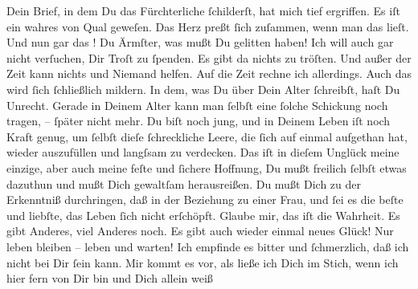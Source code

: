 \begin{ledgroupsized}[t]{13cm}
           \pstart
           Dein Brief, in dem Du das Fürchterliche ſchilderſt, hat mich tief ergriffen. Es iſt
               ein wahres \label{K_L02871-3v}\label{K_L02871-3h} von
               Qual geweſen. Das Herz preßt ſich zuſammen, wenn man das lieſt. Und nun gar das
                  \label{K_L02871-4v}\label{K_L02871-4h}! Du
               Ärmſter, was mußt Du gelitten haben! Ich will auch gar nicht verſuchen, Dir Troſt zu
               ſpenden. Es gibt  da nichts zu tröſten. Und außer der Zeit kann nichts und Niemand helfen. Auf
               die Zeit rechne ich allerdings. Auch das wird ſich ſchließlich mildern.  In dem, was Du über {\pb}Dein Alter ſchreibſt,
               haſt Du Unrecht. Gerade in Deinem Alter kann man ſelbſt eine ſolche Schickung noch
               tragen, – ſpäter nicht mehr. Du biſt noch jung, und in Deinem Leben iſt noch Kraft
               genug, um ſelbſt dieſe ſchreckliche Leere, die ſich auf einmal aufgethan hat, wieder
               auszufüllen und \strikeout{\textcolor{gray}{zu}\textcolor{gray}{×}} langſsam \introOben{}zu\introOben{} verdecken. Das iſt \strikeout{\textcolor{gray}{×}} in dieſem Unglück meine einzige, aber auch meine feſte und ſichere Hoffnung,
               Du mußt freilich ſelbſt etwas dazuthun und mußt Dich gewaltſam herausreißen. Du mußt
               Dich zu der Erkenntniß durchringen, daß in der Beziehung zu einer Frau, und ſei es
               die beſte und liebſte, das Leben ſich nicht erſchöpft. Glaube mir, das iſt die
               Wahrheit. Es gibt Anderes, viel Anderes noch. Es gibt auch wieder einmal neues Glück!
               Nur leben bleiben – leben und warten!\pend
           \pstart
           Ich empfinde es bitter und ſchmerzlich, daß ich nicht bei Dir ſein kann. Mir kommt es
               vor, als ließe ich Dich im Stich, wenn ich hier fern von Dir bin und Dich allein weiß

\end{ledgroupsized}
